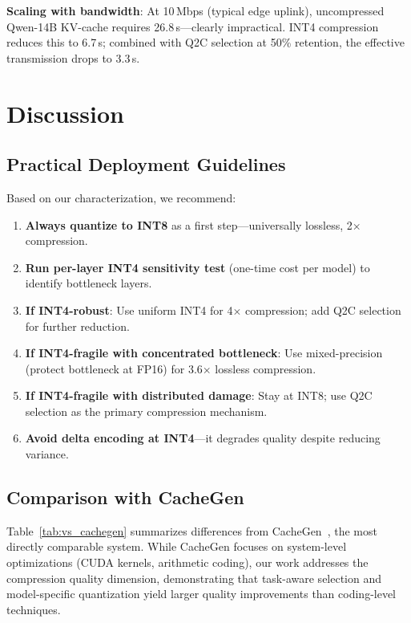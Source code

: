 \documentclass[conference]{IEEEtran}
\newcommand{\QtoC}{\textsc{Q2C}\xspace}
\begin{document}
\textbf{Scaling with bandwidth}: At 10\,Mbps (typical edge uplink), uncompressed Qwen-14B KV-cache requires 26.8\,s---clearly impractical.
INT4 compression reduces this to 6.7\,s; combined with \QtoC selection at 50\% retention, the effective transmission drops to 3.3\,s.


\section{Discussion}
\label{sec:discussion}

\subsection{Practical Deployment Guidelines}

Based on our characterization, we recommend:

\begin{enumerate}
    \item \textbf{Always quantize to INT8} as a first step---universally lossless, 2$\times$ compression.
    \item \textbf{Run per-layer INT4 sensitivity test} (one-time cost per model) to identify bottleneck layers.
    \item \textbf{If INT4-robust}: Use uniform INT4 for 4$\times$ compression; add \QtoC selection for further reduction.
    \item \textbf{If INT4-fragile with concentrated bottleneck}: Use mixed-precision (protect bottleneck at FP16) for 3.6$\times$ lossless compression.
    \item \textbf{If INT4-fragile with distributed damage}: Stay at INT8; use \QtoC selection as the primary compression mechanism.
    \item \textbf{Avoid delta encoding at INT4}---it degrades quality despite reducing variance.
\end{enumerate}

\subsection{Comparison with CacheGen}

Table~\ref{tab:vs_cachegen} summarizes differences from CacheGen~\cite{cachegen}, the most directly comparable system.
While CacheGen focuses on system-level optimizations (CUDA kernels, arithmetic coding), our work addresses the compression quality dimension, demonstrating that task-aware selection and model-specific quantization yield larger quality improvements than coding-level techniques.
\end{document}
